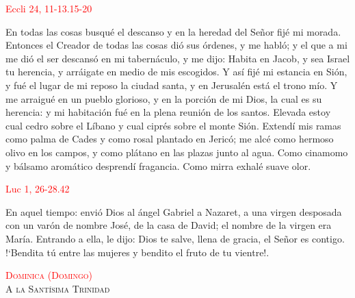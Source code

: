 \documentclass[10pt]{article}
\begin{document}
\begin{multicols}{2}
      \hfill\textcolor{red}{Eccli 24, 11-13.15-20}

      En todas las cosas busqué el descanso y en la heredad del Señor fijé mi morada. Entonces el Creador de todas las cosas dió sus órdenes, y me habló; y el que a mi me dió el ser
      descansó en mi tabernáculo, y me dijo: Habita en Jacob, y sea Israel tu herencia, y arráigate en medio de mis escogidos. Y así fijé mi estancia en Sión, y fué el lugar de mi reposo
      la ciudad santa, y en Jerusalén está el trono mío. Y me arraigué en un pueblo glorioso, y en la porción de mi Dios, la cual es su herencia: y mi habitación fué en la plena reunión
      de los santos. Elevada estoy cual cedro sobre el Líbano y cual ciprés sobre el monte Sión. Extendí mis ramas como palma de Cades y como rosal plantado en Jericó; me alcé como hermoso
      olivo en los campos, y como plátano en las plazas junto al agua. Como cinamomo y bálsamo aromático desprendí fragancia. Como mirra exhalé suave olor.\newline

      \hfill\textcolor{red}{Luc 1, 26-28.42}

      En aquel tiempo: envió Dios al ángel Gabriel a Nazaret, a una virgen desposada con un varón de nombre José, de la casa de David; el nombre de la virgen era María. 
      Entrando a ella, le dijo: Dios te salve, llena de gracia, el Señor es contigo. {!`}Bendita tú entre las mujeres y bendito el fruto de tu vientre!.\newline

      \begin{otherlanguage}{latin}
            

            

            

            

            

            

            
      \end{otherlanguage}

      \begin{center}
            \noindent\textsc{\textcolor{red}{Dominica (Domingo)}\\ {\large A la Santísima Trinidad}}
      \end{center}


\end{multicols}
\end{document}
